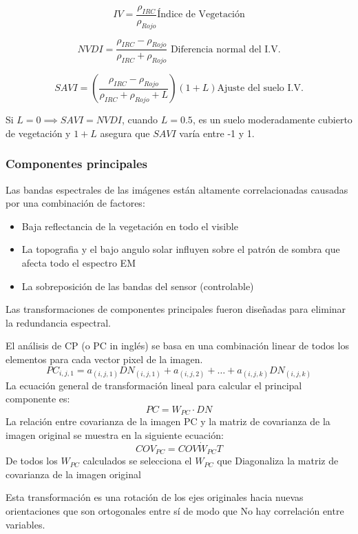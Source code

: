         \begin{equation}
            IV = \frac{\rho_{IRC}}{\rho_{Rojo}}\text{Índice de Vegetación}
        \end{equation}
        
        \begin{equation}
            NVDI =\frac{\rho_{IRC} -\rho_{Rojo}}{\rho_{IRC} +\rho_{Rojo}}\text{ Diferencia normal del I.V.}
        \end{equation}
        
        \begin{equation}
            SAVI =\left(\frac{\rho_{IRC} -\rho_{Rojo}}{\rho_{IRC} +\rho_{Rojo} + L}\right)\left(1 + L\right)\text{Ajuste del suelo I.V.}
        \end{equation}
        
        Si $L=0\implies SAVI=NVDI$, cuando $L=0.5$, es un suelo moderadamente cubierto de vegetación y $1+L$ asegura que $SAVI$ varía entre -1 y 1.
        

        \subsubsection{Componentes principales}

        Las bandas espectrales de las imágenes están altamente 
        correlacionadas causadas por una combinación de factores:
        \begin{itemize}
            \item Baja reflectancia de la vegetación en todo el visible
            \item La topografia y el bajo angulo solar influyen sobre el  patrón de sombra que afecta todo el espectro EM
            \item La sobreposición de las bandas del sensor (controlable)
        \end{itemize}
        
        Las transformaciones de componentes principales fueron 
        diseñadas para eliminar la redundancia espectral.
        
        El análisis de CP (o PC in inglés) se basa en una combinación
        linear de todos los elementos para cada vector pixel de la 
        imagen.
        \begin{equation}
            PC_{i,j,1} = a_{(i,j,1)}DN_{(i,j,1)} + a_{(i,j,2)} + \dots + a_{(i,j,k)}DN_{(i,j,k)}
        \end{equation}
        La ecuación general de transformación lineal para calcular el 
        principal componente es:
        \begin{equation}
            PC = W_{PC}\cdot DN
        \end{equation}
        La relación entre covarianza de la imagen PC y la matriz de
        covarianza de la imagen original se muestra en la siguiente 
        ecuación:
        \begin{equation}
            COV_{PC} = COV\dot W_{PC}T
        \end{equation}
        De todos los $W_{PC}$ calculados se selecciona el $W_{PC}$  que 
        Diagonaliza la matriz de covarianza de la imagen original 
        
        Esta transformación es una rotación de los ejes originales hacia 
        nuevas  orientaciones que son ortogonales entre sí de modo que
        No hay correlación entre variables.






